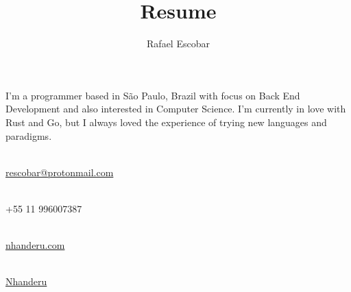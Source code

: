 \documentclass[12pt]{resume}
\title{Resume}
\author{Rafael Escobar}
\begin{document}
    
    \begin{textblock}
        I’m a programmer based in São Paulo, Brazil with focus on Back End
        Development and also interested in Computer Science. I'm currently in
        love with Rust and Go, but I always loved the experience of trying new
        languages and paradigms.
    \end{textblock}

    \begin{textblock}
        \begin{minipage}[t]{.35\linewidth}
            \\
            \href{mailto:rescobar@protonmail.com}{rescobar@protonmail.com}
        \end{minipage}
        \begin{minipage}[t]{.25\linewidth}
            \\
            +55 11 996007387
        \end{minipage}
        \begin{minipage}[t]{.225\linewidth}
            \\
            \href{https://nhanderu.com}{nhanderu.com}
        \end{minipage}
        \begin{minipage}[t]{.15\linewidth}
            \\
            \href{https://github.com/Nhanderu}{Nhanderu}
        \end{minipage}
    \end{textblock}
    
    
\end{document}
